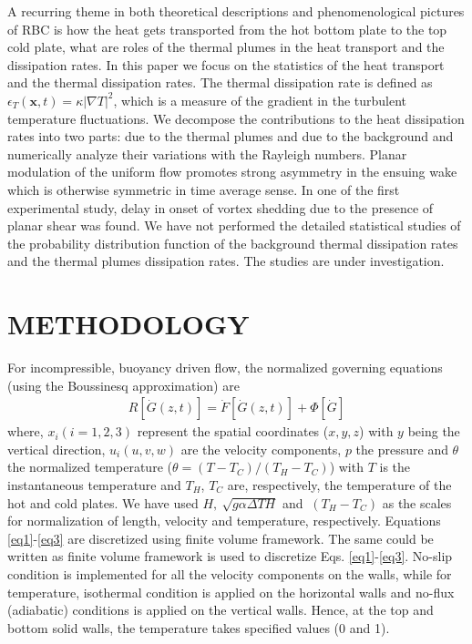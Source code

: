 \documentclass[10pt, conference]{FMFP2022}
\begin{document}
A recurring theme in both theoretical descriptions and phenomenological pictures of RBC is how the heat gets transported from the hot bottom plate to the top cold plate, what are roles of the thermal plumes in the heat transport and the dissipation rates. In this paper we focus on the statistics of the heat transport and the thermal dissipation rates. The thermal dissipation rate is defined as $\epsilon_T(\mathbf{x},t)=\kappa|\nabla T|^2$, which is a measure of the gradient in the turbulent temperature fluctuations. We decompose the contributions to the heat dissipation rates into two parts: due to the thermal plumes and due to the background and numerically analyze their variations with the Rayleigh numbers. Planar modulation of the uniform flow promotes strong asymmetry in the ensuing wake which is otherwise symmetric in time average sense. In one of the first experimental study, delay in onset of vortex shedding due to the presence of planar shear was found. We have not performed the detailed statistical studies of the probability distribution function of the background thermal dissipation rates and the thermal plumes dissipation rates. The studies are under investigation.
 
\section{\textbf{METHODOLOGY}}\label{sec2}
For incompressible, buoyancy driven flow, the normalized governing equations (using the Boussinesq approximation) are
\begin{eqnarray}
R[\dot{G}(z, t)]=\dot{F}[\dot{G}(z, t)]+\Phi[\dot{G}]
\end{eqnarray}
where, $x_i (i=1,2, 3)$ represent the spatial coordinates ($x,y,z$) with $y$ being the vertical direction, $u_i(u, v,w)$ are the velocity components, $p$ the pressure and  $\theta$ the normalized temperature ($\theta=(T-T_C)/(T_H-T_C)$) with $T$ is the instantaneous temperature and $T_H$, $T_C$ are, respectively, the temperature of the hot and cold plates. We have used  $H,~\sqrt{g \alpha \Delta T H}$ and $~(T_H-T_C)$  as the scales for normalization of length, velocity and temperature, respectively. Equations \ref{eq1}-\ref{eq3} are discretized using finite volume framework. The same could be written as finite volume framework is used to discretize Eqs. \ref{eq1}-\ref{eq3}. No-slip condition is implemented for all the velocity components on the walls, while for temperature, isothermal condition is applied on the horizontal walls and no-flux (adiabatic) conditions is applied on the vertical walls. Hence, at the top and bottom solid walls, the temperature takes specified values (0 and 1).
\end{document}

